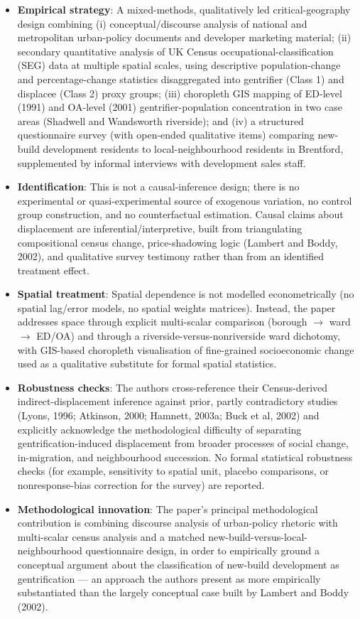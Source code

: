 \begin{itemize}
  \item \textbf{Empirical strategy}: A mixed-methods, qualitatively led critical-geography design combining (i) conceptual/discourse analysis of national and metropolitan urban-policy documents and developer marketing material; (ii) secondary quantitative analysis of UK Census occupational-classification (SEG) data at multiple spatial scales, using descriptive population-change and percentage-change statistics disaggregated into gentrifier (Class 1) and displacee (Class 2) proxy groups; (iii) choropleth GIS mapping of ED-level (1991) and OA-level (2001) gentrifier-population concentration in two case areas (Shadwell and Wandsworth riverside); and (iv) a structured questionnaire survey (with open-ended qualitative items) comparing new-build development residents to local-neighbourhood residents in Brentford, supplemented by informal interviews with development sales staff.
  \item \textbf{Identification}: This is not a causal-inference design; there is no experimental or quasi-experimental source of exogenous variation, no control group construction, and no counterfactual estimation. Causal claims about displacement are inferential/interpretive, built from triangulating compositional census change, price-shadowing logic (Lambert and Boddy, 2002), and qualitative survey testimony rather than from an identified treatment effect.
  \item \textbf{Spatial treatment}: Spatial dependence is not modelled econometrically (no spatial lag/error models, no spatial weights matrices). Instead, the paper addresses space through explicit multi-scalar comparison (borough $\rightarrow$ ward $\rightarrow$ ED/OA) and through a riverside-versus-nonriverside ward dichotomy, with GIS-based choropleth visualisation of fine-grained socioeconomic change used as a qualitative substitute for formal spatial statistics.
  \item \textbf{Robustness checks}: The authors cross-reference their Census-derived indirect-displacement inference against prior, partly contradictory studies (Lyons, 1996; Atkinson, 2000; Hamnett, 2003a; Buck et al, 2002) and explicitly acknowledge the methodological difficulty of separating gentrification-induced displacement from broader processes of social change, in-migration, and neighbourhood succession. No formal statistical robustness checks (for example, sensitivity to spatial unit, placebo comparisons, or nonresponse-bias correction for the survey) are reported.
  \item \textbf{Methodological innovation}: The paper's principal methodological contribution is combining discourse analysis of urban-policy rhetoric with multi-scalar census analysis and a matched new-build-versus-local-neighbourhood questionnaire design, in order to empirically ground a conceptual argument about the classification of new-build development as gentrification --- an approach the authors present as more empirically substantiated than the largely conceptual case built by Lambert and Boddy (2002).
\end{itemize}


